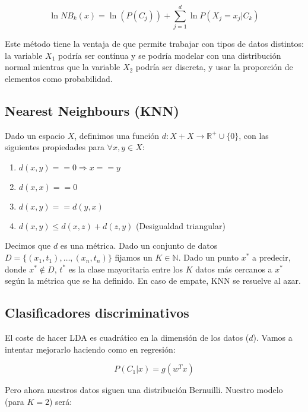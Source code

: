 \begin{equation*}
    \ln NB_k(x) = \ln(P(C_j)) + \sum_{j = 1}^{d} \ln P(X_j = x_j | C_k)
\end{equation*}

Este método tiene la ventaja de que permite trabajar con tipos de datos distintos: la variable $X_1$ podría ser contínua y se podría modelar con una distribución normal mientras que la variable $X_2$ podría ser discreta, y usar la proporción de elementos como probabilidad.

\subsection{Nearest Neighbours (KNN)}

Dado un espacio $X$, definimos una función $d: X + X \rightarrow \mathbb{R}^+ \cup \{0\}$, con las siguientes propiedades para $\forall x,y \in X$:

\begin{enumerate}
    \item $d(x,y) == 0 \Rightarrow x == y$
    \item $d(x,x) == 0$
    \item $d(x,y) == d(y,x)$
    \item $d(x,y) \leq d(x,z) + d(z,y)$ (Desigualdad triangular)
\end{enumerate}

Decimos que $d$ es una métrica. Dado un conjunto de datos $D = \{(x_1, t_1), \dots, (x_n, t_n)\}$ fijamos un $K \in \mathbb{N}$. Dado un punto $x^*$ a predecir, donde $x^* \notin D$, $t^*$ es la clase mayoritaria entre los $K$ datos más cercanos a $x^*$ según la métrica que se ha definido. En caso de empate, KNN se resuelve al azar.



\subsection{Clasificadores discriminativos}
El coste de hacer LDA es cuadrático en la dimensión de los datos ($d$). Vamos a intentar mejorarlo haciendo como en regresión:

\begin{equation*}
    P(C_1 | x) = g(w^Tx)
\end{equation*}

Pero ahora nuestros datos siguen una distribución Bernuilli. Nuestro modelo (para $K = 2$) será:

